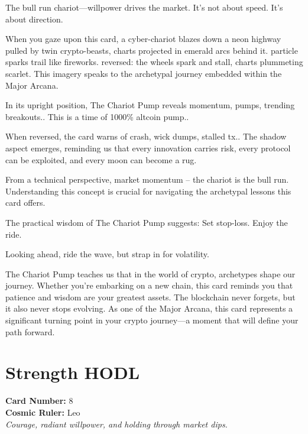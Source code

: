 \documentclass[11pt,oneside]{book}
\begin{document}
\begin{minipage}[t]{0.55\textwidth}
  The bull run chariot—willpower drives the market. It's not about speed. It's about direction.

  When you gaze upon this card, a cyber-chariot blazes down a neon highway pulled by twin crypto-beasts, charts projected in emerald arcs behind it. particle sparks trail like fireworks. reversed: the wheels spark and stall, charts plummeting scarlet. This imagery speaks to the archetypal journey embedded within the Major Arcana.

  In its upright position, The Chariot Pump reveals momentum, pumps, trending breakouts.. This is a time of 1000\% altcoin pump..

  When reversed, the card warns of crash, wick dumps, stalled tx.. The shadow aspect emerges, reminding us that every innovation carries risk, every protocol can be exploited, and every moon can become a rug.

  From a technical perspective, market momentum – the chariot is the bull run. Understanding this concept is crucial for navigating the archetypal lessons this card offers.

  The practical wisdom of The Chariot Pump suggests: Set stop-loss. Enjoy the ride.

  Looking ahead, ride the wave, but strap in for volatility.

  The Chariot Pump teaches us that in the world of crypto, archetypes shape our journey. Whether you're embarking on a new chain, this card reminds you that patience and wisdom are your greatest assets. The blockchain never forgets, but it also never stops evolving. As one of the Major Arcana, this card represents a significant turning point in your crypto journey—a moment that will define your path forward.

\end{minipage}

\newpage
\section*{Strength HODL}

\begin{minipage}[t]{0.55\textwidth}
  \vspace{0pt}
  \textbf{Card Number:} 8\\  \textbf{Cosmic Ruler:} Leo\\  \textit{Courage, radiant willpower, and holding through market dips.}
\end{minipage}
\end{document}
